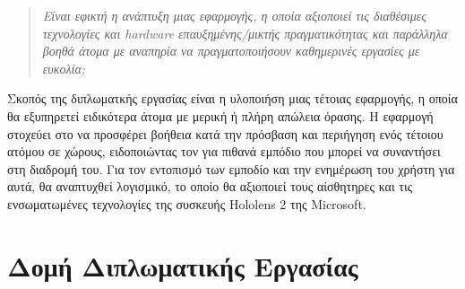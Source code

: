 \begin{quote}
    \textit{Είναι εφικτή η ανάπτυξη μιας εφαρμογής, η οποία  αξιοποιεί τις διαθέσιμες τεχνολογίες και hardware επαυξημένης/μικτής πραγματικότητας και παράλληλα βοηθά άτομα με αναπηρία να πραγματοποιήσουν καθημερινές εργασίες με ευκολία;}
\end{quote}
Σκοπός της διπλωματκής εργασίας είναι η υλοποιήση μιας τέτοιας εφαρμογής, η οποία θα εξυπηρετεί ειδικότερα άτομα με μερική ή πλήρη απώλεια όρασης. Η εφαρμογή στοχεύει στο να προσφέρει βοήθεια κατά την πρόσβαση και περιήγηση ενός τέτοιου ατόμου σε χώρους, ειδοποιώντας τον για πιθανά εμπόδιο που μπορεί να συναντήσει στη διαδρομή του. Για τον εντοπισμό των εμποδίο και την ενημέρωση του χρήστη για αυτά, θα αναπτυχθεί λογισμικό, το οποίο θα αξιοποιεί τους αίσθητηρες και τις ενσωματωμένες τεχνολογίες της συσκευής Hololens 2 της Microsoft.

\section{Δομή Διπλωματικής Εργασίας}
